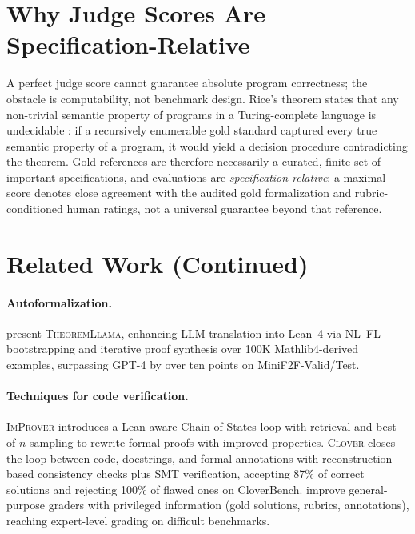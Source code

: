 \documentclass{article}
\begin{document}
\section{Why Judge Scores Are Specification-Relative}\label{app:spec-relative}

A perfect judge score cannot guarantee absolute program correctness; the obstacle is computability, not benchmark design.
Rice's theorem states that any non-trivial semantic property of programs in a Turing-complete language is undecidable \citep{rice1953}: if a recursively enumerable gold standard captured every true semantic property of a program, it would yield a decision procedure contradicting the theorem.
Gold references are therefore necessarily a curated, finite set of important specifications, and evaluations are \emph{specification-relative}: a maximal score denotes close agreement with the audited gold formalization and rubric-conditioned human ratings, not a universal guarantee beyond that reference.

\section{Related Work (Continued)}\label{app:related-cont}

\paragraph{Autoformalization.}
\citet{wang2024theoremLlama} present \textsc{TheoremLlama}, enhancing LLM translation into Lean~4 via NL--FL bootstrapping and iterative proof synthesis over 100K Mathlib4-derived examples, surpassing GPT-4 by over ten points on MiniF2F-Valid/Test.

\paragraph{Techniques for code verification.}
\textsc{ImProver} \citep{ahuja2024improver} introduces a Lean-aware Chain-of-States loop with retrieval and best-of-$n$ sampling to rewrite formal proofs with improved properties.
\textsc{Clover} \citep{sun2024clover} closes the loop between code, docstrings, and formal annotations with reconstruction-based consistency checks plus SMT verification, accepting 87\% of correct solutions and rejecting 100\% of flawed ones on CloverBench.
\citet{zhou2025graders} improve general-purpose graders with privileged information (gold solutions, rubrics, annotations), reaching expert-level grading on difficult benchmarks.
\end{document}

